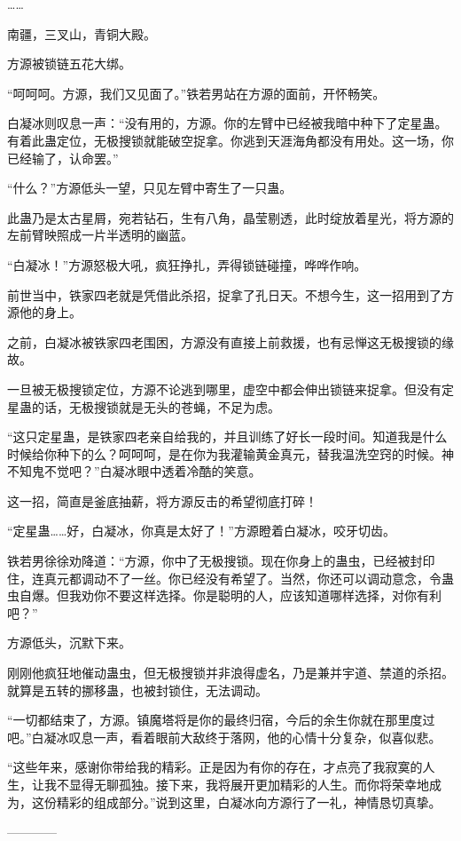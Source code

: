 \begin{this_body}
……

南疆，三叉山，青铜大殿。

方源被锁链五花大绑。

“呵呵呵。方源，我们又见面了。”铁若男站在方源的面前，开怀畅笑。

白凝冰则叹息一声：“没有用的，方源。你的左臂中已经被我暗中种下了定星蛊。有着此蛊定位，无极搜锁就能破空捉拿。你逃到天涯海角都没有用处。这一场，你已经输了，认命罢。”

“什么？”方源低头一望，只见左臂中寄生了一只蛊。

此蛊乃是太古星屑，宛若钻石，生有八角，晶莹剔透，此时绽放着星光，将方源的左前臂映照成一片半透明的幽蓝。

“白凝冰！”方源怒极大吼，疯狂挣扎，弄得锁链碰撞，哗哗作响。

前世当中，铁家四老就是凭借此杀招，捉拿了孔日天。不想今生，这一招用到了方源他的身上。

之前，白凝冰被铁家四老围困，方源没有直接上前救援，也有忌惮这无极搜锁的缘故。

一旦被无极搜锁定位，方源不论逃到哪里，虚空中都会伸出锁链来捉拿。但没有定星蛊的话，无极搜锁就是无头的苍蝇，不足为虑。

“这只定星蛊，是铁家四老亲自给我的，并且训练了好长一段时间。知道我是什么时候给你种下的么？呵呵呵，是在你为我灌输黄金真元，替我温洗空窍的时候。神不知鬼不觉吧？”白凝冰眼中透着冷酷的笑意。

这一招，简直是釜底抽薪，将方源反击的希望彻底打碎！

“定星蛊……好，白凝冰，你真是太好了！”方源瞪着白凝冰，咬牙切齿。

铁若男徐徐劝降道：“方源，你中了无极搜锁。现在你身上的蛊虫，已经被封印住，连真元都调动不了一丝。你已经没有希望了。当然，你还可以调动意念，令蛊虫自爆。但我劝你不要这样选择。你是聪明的人，应该知道哪样选择，对你有利吧？”

方源低头，沉默下来。

刚刚他疯狂地催动蛊虫，但无极搜锁并非浪得虚名，乃是兼并宇道、禁道的杀招。就算是五转的挪移蛊，也被封锁住，无法调动。

“一切都结束了，方源。镇魔塔将是你的最终归宿，今后的余生你就在那里度过吧。”白凝冰叹息一声，看着眼前大敌终于落网，他的心情十分复杂，似喜似悲。

“这些年来，感谢你带给我的精彩。正是因为有你的存在，才点亮了我寂寞的人生，让我不显得无聊孤独。接下来，我将展开更加精彩的人生。而你将荣幸地成为，这份精彩的组成部分。”说到这里，白凝冰向方源行了一礼，神情恳切真挚。

------------

\end{this_body}

